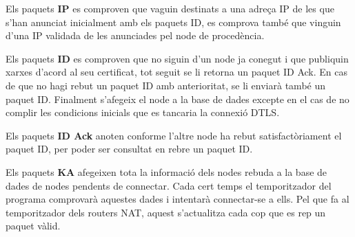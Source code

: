 Els paquets \textbf{IP} es comproven que vaguin destinats a una adreça IP de les que s'han anunciat inicialment amb els paquets ID, es comprova també que vinguin d'una IP validada de les anunciades pel node de procedència. 

Els paquets \textbf{ID} es comproven que no siguin d'un node ja conegut i que publiquin xarxes d'acord al seu certificat, tot seguit se li retorna un paquet ID Ack. En cas de que no hagi rebut un paquet ID amb anterioritat, se li enviarà també un paquet ID. Finalment s'afegeix el node a la base de dades excepte en el cas de no complir les condicions inicials que es tancaria la connexió DTLS.

Els paquets \textbf{ID Ack} anoten conforme l'altre node ha rebut satisfactòriament el paquet ID, per poder ser consultat en rebre un paquet ID.

Els paquets \textbf{KA} afegeixen tota la informació dels nodes rebuda a la base de dades de nodes pendents de connectar. Cada cert temps el temporitzador del programa comprovarà aquestes dades i intentarà connectar-se a ells. Pel que fa al temporitzador dels routers NAT, aquest s'actualitza cada cop que es rep un paquet vàlid.

